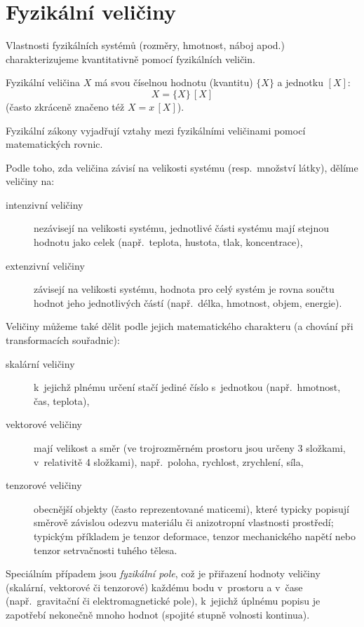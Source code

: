 \chapter{Fyzikální veličiny}

Vlastnosti fyzikálních systémů (rozměry, hmotnost, náboj apod.) charakterizujeme kvantitativně pomocí fyzikálních veličin.

Fyzikální veličina $X$ má svou číselnou hodnotu (kvantitu) $\{X\}$ a jednotku $[X]$:
$$ X = \{X\}\,[X] $$
(často zkráceně značeno též $X = x\,[X]$).

Fyzikální zákony vyjadřují vztahy mezi fyzikálními veličinami pomocí matematických rovnic.

Podle toho, zda veličina závisí na velikosti systému (resp.~množství látky), dělíme veličiny na:
\begin{description}
    \item[intenzivní veličiny] nezávisejí na velikosti systému, jednotlivé části systému mají stejnou hodnotu jako celek (např.~teplota, hustota, tlak, koncentrace),
    \item[extenzivní veličiny] závisejí na velikosti systému, hodnota pro celý systém je rovna součtu hodnot jeho jednotlivých částí (např.~délka, hmotnost, objem, energie).
\end{description}

Veličiny můžeme také dělit podle jejich matematického charakteru (a chování při transformacích souřadnic):
\begin{description}
    \item[skalární veličiny] k~jejichž plnému určení stačí jediné číslo s~jednotkou (např.~hmotnost, čas, teplota),
    \item[vektorové veličiny] mají velikost a směr (ve trojrozměrném prostoru jsou určeny 3 složkami, v~relativitě 4 složkami), např.~poloha, rychlost, zrychlení, síla,
    \item[tenzorové veličiny] obecnější objekty (často reprezentované maticemi), které typicky popisují směrově závislou odezvu materiálu či anizotropní vlastnosti prostředí; typickým příkladem je tenzor deformace, tenzor mechanického napětí nebo tenzor setrvačnosti tuhého tělesa.
\end{description}

Speciálním případem jsou \emph{fyzikální pole}, což je přiřazení hodnoty veličiny (skalární, vektorové či tenzorové) každému bodu v~prostoru a v~čase (např.~gravitační či elektromagnetické pole), k~jejichž úplnému popisu je zapotřebí nekonečně mnoho hodnot (spojité stupně volnosti kontinua).

